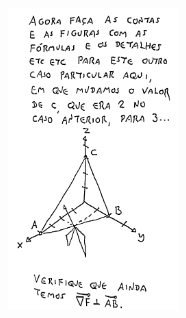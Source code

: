 \documentclass[oneside,12pt]{article}
\begin{document}
\newpage

%
\qquad
%
\includegraphics[height=8cm]{2020-2-C3/20210430_grad_423.pdf}










\end{document}
